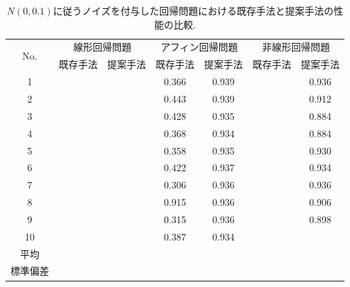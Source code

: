 \documentclass[11pt,oneside,openany,report]{jsbook}
\begin{document}
\begin{table}[tbp]
  \caption{$N(0,0.1)$に従うノイズを付与した回帰問題における既存手法と提案手法の性能の比較.}
  \label{table:exp
  :result:regression_noizy_0.1}
  \centering
  \begin{tabular}{|c|c|c|c|c|c|c|}
    \hline
    \multirow{2}{*}{No. } & \multicolumn{2}{c|}{線形回帰問題} & \multicolumn{2}{c|}{アフィン回帰問題} & \multicolumn{2}{c|}{非線形回帰問題} \\
    \cline{2-7}
    & 既存手法 & 提案手法 & 既存手法 & 提案手法 & 既存手法 & 提案手法 \\
    \hline \hline
    1       &   &  & 0.366 & 0.939 &  & 0.936 \\
    2       &   &  & 0.443 & 0.939 &  & 0.912 \\
    3       &   &  & 0.428 & 0.935 &  & 0.884 \\
    4       &   &  & 0.368 & 0.934 &  & 0.884 \\
    5       &   &  & 0.358 & 0.935 &  & 0.930 \\
    6       &   &  & 0.422 & 0.937 &  & 0.934 \\
    7       &   &  & 0.306 & 0.936 &  & 0.936 \\
    8       &   &  & 0.915 & 0.936 &  & 0.906 \\
    9       &   &  & 0.315 & 0.936 &  & 0.898 \\
    10      &   &  & 0.387 & 0.934 &  &  \\
    \hline
    平均 & & & & & & \\
    標準偏差 & & & & & & \\
    \hline
  \end{tabular}
\end{table}
\end{document}
